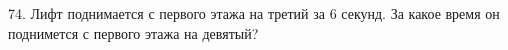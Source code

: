 74. Лифт поднимается с первого этажа на третий за 6 секунд. За какое время он поднимется с первого этажа на девятый?\\
